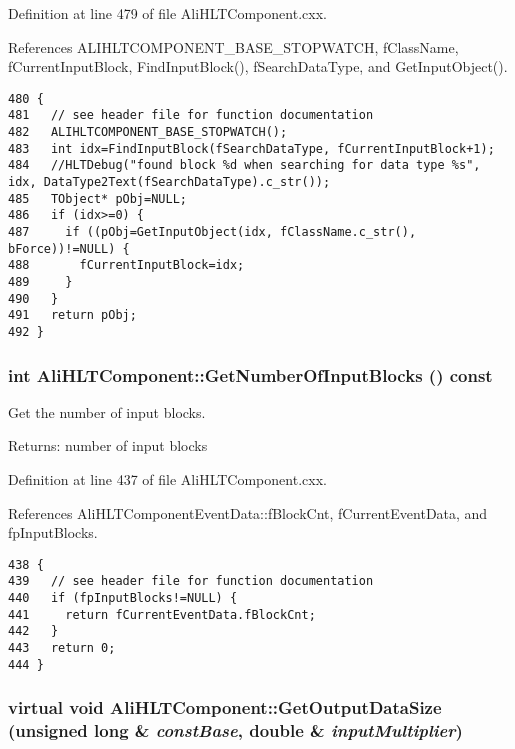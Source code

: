 Definition at line 479 of file Ali\-HLTComponent.cxx.

References ALIHLTCOMPONENT\_\-BASE\_\-STOPWATCH, f\-Class\-Name, f\-Current\-Input\-Block, Find\-Input\-Block(), f\-Search\-Data\-Type, and Get\-Input\-Object().

\footnotesize\begin{verbatim}480 {
481   // see header file for function documentation
482   ALIHLTCOMPONENT_BASE_STOPWATCH();
483   int idx=FindInputBlock(fSearchDataType, fCurrentInputBlock+1);
484   //HLTDebug("found block %d when searching for data type %s", idx, DataType2Text(fSearchDataType).c_str());
485   TObject* pObj=NULL;
486   if (idx>=0) {
487     if ((pObj=GetInputObject(idx, fClassName.c_str(), bForce))!=NULL) {
488       fCurrentInputBlock=idx;
489     }
490   }
491   return pObj;
492 }
\end{verbatim}\normalsize 


\subsubsection{\setlength{\rightskip}{0pt plus 5cm}int Ali\-HLTComponent::Get\-Number\-Of\-Input\-Blocks () const\hspace{0.3cm}{\tt  [protected]}}\label{classAliHLTComponent_b12}


Get the number of input blocks. \begin{Desc}
\item[Returns:]number of input blocks \end{Desc}


Definition at line 437 of file Ali\-HLTComponent.cxx.

References Ali\-HLTComponent\-Event\-Data::f\-Block\-Cnt, f\-Current\-Event\-Data, and fp\-Input\-Blocks.

\footnotesize\begin{verbatim}438 {
439   // see header file for function documentation
440   if (fpInputBlocks!=NULL) {
441     return fCurrentEventData.fBlockCnt;
442   }
443   return 0;
444 }
\end{verbatim}\normalsize 


\subsubsection{\setlength{\rightskip}{0pt plus 5cm}virtual void Ali\-HLTComponent::Get\-Output\-Data\-Size (unsigned long \& {\em const\-Base}, double \& {\em input\-Multiplier})\hspace{0.3cm}{\tt  [pure virtual]}}\label{classAliHLTComponent_a12}


